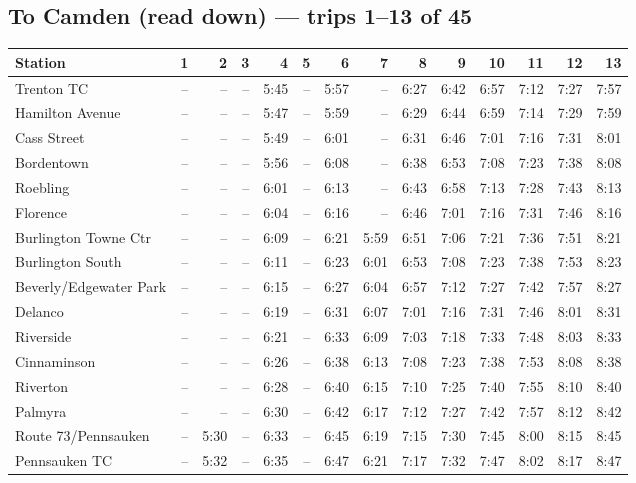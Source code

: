\subsection*{To Camden (read down) --- trips 1--13 of 45}
\begin{center}\footnotesize\setlength{\tabcolsep}{3pt}\begin{tabular}{@{}lrrrrrrrrrrrrr@{}}\toprule
Station & 1 & 2 & 3 & 4 & 5 & 6 & 7 & 8 & 9 & 10 & 11 & 12 & 13 \\\midrule
Trenton TC & -- & -- & -- & 5:45 & -- & 5:57 & -- & 6:27 & 6:42 & 6:57 & 7:12 & 7:27 & 7:57 \\
Hamilton Avenue & -- & -- & -- & 5:47 & -- & 5:59 & -- & 6:29 & 6:44 & 6:59 & 7:14 & 7:29 & 7:59 \\
Cass Street & -- & -- & -- & 5:49 & -- & 6:01 & -- & 6:31 & 6:46 & 7:01 & 7:16 & 7:31 & 8:01 \\
Bordentown & -- & -- & -- & 5:56 & -- & 6:08 & -- & 6:38 & 6:53 & 7:08 & 7:23 & 7:38 & 8:08 \\
Roebling & -- & -- & -- & 6:01 & -- & 6:13 & -- & 6:43 & 6:58 & 7:13 & 7:28 & 7:43 & 8:13 \\
Florence & -- & -- & -- & 6:04 & -- & 6:16 & -- & 6:46 & 7:01 & 7:16 & 7:31 & 7:46 & 8:16 \\
Burlington Towne Ctr & -- & -- & -- & 6:09 & -- & 6:21 & 5:59 & 6:51 & 7:06 & 7:21 & 7:36 & 7:51 & 8:21 \\
Burlington South & -- & -- & -- & 6:11 & -- & 6:23 & 6:01 & 6:53 & 7:08 & 7:23 & 7:38 & 7:53 & 8:23 \\
Beverly/Edgewater Park & -- & -- & -- & 6:15 & -- & 6:27 & 6:04 & 6:57 & 7:12 & 7:27 & 7:42 & 7:57 & 8:27 \\
Delanco & -- & -- & -- & 6:19 & -- & 6:31 & 6:07 & 7:01 & 7:16 & 7:31 & 7:46 & 8:01 & 8:31 \\
Riverside & -- & -- & -- & 6:21 & -- & 6:33 & 6:09 & 7:03 & 7:18 & 7:33 & 7:48 & 8:03 & 8:33 \\
Cinnaminson & -- & -- & -- & 6:26 & -- & 6:38 & 6:13 & 7:08 & 7:23 & 7:38 & 7:53 & 8:08 & 8:38 \\
Riverton & -- & -- & -- & 6:28 & -- & 6:40 & 6:15 & 7:10 & 7:25 & 7:40 & 7:55 & 8:10 & 8:40 \\
Palmyra & -- & -- & -- & 6:30 & -- & 6:42 & 6:17 & 7:12 & 7:27 & 7:42 & 7:57 & 8:12 & 8:42 \\
Route 73/Pennsauken & -- & 5:30 & -- & 6:33 & -- & 6:45 & 6:19 & 7:15 & 7:30 & 7:45 & 8:00 & 8:15 & 8:45 \\
Pennsauken TC & -- & 5:32 & -- & 6:35 & -- & 6:47 & 6:21 & 7:17 & 7:32 & 7:47 & 8:02 & 8:17 & 8:47 \\

\end{tabular}
\end{center}
